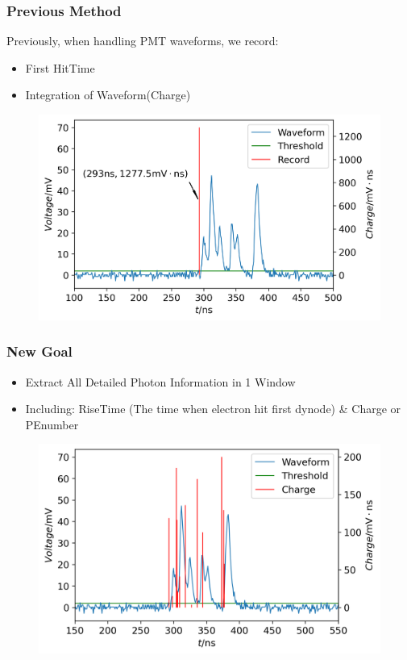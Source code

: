 \documentclass{beamer}
\begin{document}
\begin{frame}
\frametitle{Previous Method}
\hspace{4mm}Previously, when handling PMT waveforms, we record:
\begin{itemize}
    \item First HitTime
    \item Integration of Waveform(Charge)
\end{itemize}
\begin{figure}
    \centering
    \includegraphics[width=0.8\linewidth]{img/previous.png}
\end{figure}
\end{frame}

\begin{frame}
\frametitle{New Goal}
\begin{itemize}
    \item Extract All Detailed Photon Information in 1 Window
    \item Including: RiseTime (The time when electron hit first dynode) \& Charge or PEnumber
\end{itemize}
\begin{figure}
    \centering
    \includegraphics[width=0.8\linewidth]{img/goal.png}
\end{figure}
\end{frame}
\end{document}
